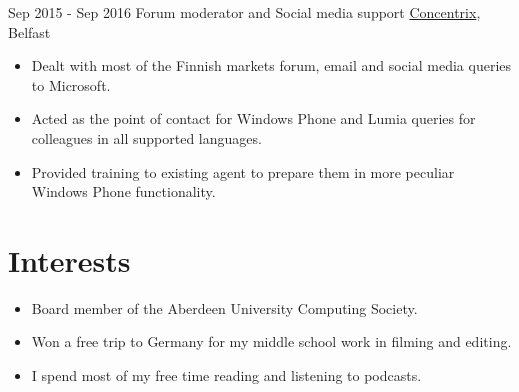 \documentclass[letterpaper]{twentysecondcv} %
\begin{document}
\begin{twenty}
     \twentyitem
   		{Sep 2015 -}
		{Sep 2016}
        {Forum moderator and Social media support}
        {\href{https://www.concentrix.com/}{Concentrix}, Belfast}
        {}
        {
        \begin{itemize}
        \item Dealt with most of the Finnish markets forum, email and social media queries to Microsoft.
        \item Acted as the point of contact for Windows Phone and Lumia queries for colleagues in all supported languages.
        \item Provided training to existing agent to prepare them in more peculiar Windows Phone functionality.
    \end{itemize}
    	}

\end{twenty}


\section{Interests}
    \begin{itemize}
       \item Board member of the Aberdeen University Computing Society.
       \item Won a free trip to Germany for my middle school work in filming and editing.
       \item I spend most of my free time reading and listening to podcasts.
    \end{itemize}
\end{document}
